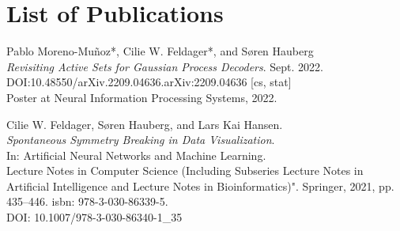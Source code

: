 



\begingroup
\let\clearpage\relax

\section*{List of Publications}
Pablo Moreno-Mu\~{n}oz*, Cilie W. Feldager*, and Søren Hauberg \\ \textit{Revisiting Active Sets for Gaussian Process Decoders}. Sept. 2022.
\\ \textsc{DOI}:10.48550/arXiv.2209.04636.arXiv:2209.04636 [cs, stat]
\\ Poster at Neural Information Processing Systems, 2022.

\vspace{1cm}
Cilie W. Feldager, Søren Hauberg, and Lars Kai Hansen.\\  \textit{Spontaneous Symmetry Breaking in Data Visualization}.\\ In: Artificial Neural Networks and Machine Learning. \\
Lecture Notes in Computer Science (Including Subseries Lecture Notes in Artificial Intelligence and Lecture Notes in Bioinformatics)".
Springer, 2021, pp. 435–446. isbn: 978-3-030-86339-5.\\
\textsc{DOI}: 10.1007/978-3-030-86340-1\_35


\endgroup